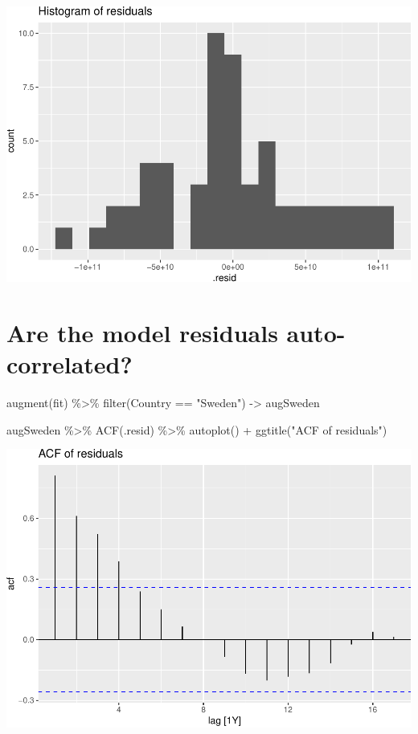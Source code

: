 \documentclass[
]{book}
\newenvironment{Shaded}{\begin{snugshade}}{\end{snugshade}}
\newcommand{\FunctionTok}[1]{\textcolor[rgb]{0.00,0.00,0.00}{#1}}
\newcommand{\NormalTok}[1]{#1}
\newcommand{\OtherTok}[1]{\textcolor[rgb]{0.56,0.35,0.01}{#1}}
\newcommand{\SpecialCharTok}[1]{\textcolor[rgb]{0.00,0.00,0.00}{#1}}
\newcommand{\StringTok}[1]{\textcolor[rgb]{0.31,0.60,0.02}{#1}}
\begin{document}
\includegraphics{graphics/unnamed-chunk-67-1.pdf}

\hypertarget{are-the-model-residuals-auto-correlated-1}{%
\section{Are the model residuals auto-correlated?}\label{are-the-model-residuals-auto-correlated-1}}

\begin{Shaded}
\begin{Highlighting}[]
\FunctionTok{augment}\NormalTok{(fit) }\SpecialCharTok{\%\textgreater{}\%} \FunctionTok{filter}\NormalTok{(Country }\SpecialCharTok{==} \StringTok{"Sweden"}\NormalTok{) }\OtherTok{{-}\textgreater{}}\NormalTok{ augSweden}

\NormalTok{augSweden }\SpecialCharTok{\%\textgreater{}\%}
  \FunctionTok{ACF}\NormalTok{(.resid) }\SpecialCharTok{\%\textgreater{}\%}
  \FunctionTok{autoplot}\NormalTok{() }\SpecialCharTok{+} \FunctionTok{ggtitle}\NormalTok{(}\StringTok{"ACF of residuals"}\NormalTok{)}
\end{Highlighting}
\end{Shaded}

\includegraphics{graphics/unnamed-chunk-68-1.pdf}
\end{document}
